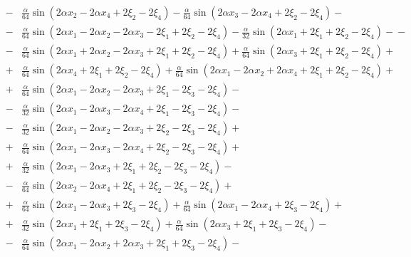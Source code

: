 \documentclass[11pt]{jfm}
\numberwithin{equation}{section}
\begin{document}
\begin{eqnarray}
&\!-\!& \frac{\alpha}{64} \sin(2\alpha x_2 \!-\! 2\alpha x_4 \!+\! 2\xi_2 \!-\! 2\xi_4)\!-\! \frac{\alpha}{64} \sin(2\alpha x_3 \!-\! 2\alpha x_4 \!+\! 2\xi_2 \!-\! 2\xi_4)\!-\! \nonumber\\
&\!-\! &\frac{\alpha}{64} \sin(2\alpha x_1 \!-\! 2\alpha x_2 \!-\! 2\alpha x_3 \!-\! 2\xi_1 \!+\! 2\xi_2 \!-\! 2\xi_4)\!-\! \frac{\alpha}{32} \sin(2\alpha x_1 \!+\! 2\xi_1 \!+\! 2\xi_2 \!-\! 2\xi_4)\!-\!
- \nonumber\\
&\!-\!&\frac{\alpha}{64} \sin(2\alpha x_1 \!+\! 2\alpha x_2 \!-\! 2\alpha x_3 \!+\! 2\xi_1 \!+\! 2\xi_2 \!-\! 2\xi_4)\!+\! \frac{\alpha}{64} \sin(2\alpha x_3 \!+\! 2\xi_1 \!+\! 2\xi_2 \!-\! 2\xi_4)\!+\!\nonumber\\
&\!+\!&\frac{\alpha}{64} \sin(2\alpha x_4 \!+\! 2\xi_1 \!+\! 2\xi_2 \!-\! 2\xi_4)\!+\! \frac{\alpha}{64} \sin(2\alpha x_1 \!-\! 2\alpha x_2 \!+\! 2\alpha x_4 \!+\! 2\xi_1 \!+\! 2\xi_2 \!-\! 2\xi_4)\!+\!\nonumber\\
&\!+\!& \frac{\alpha}{64} \sin(2\alpha x_1 \!-\! 2\alpha x_2 \!-\! 2\alpha x_3 \!+\! 2\xi_1 \!-\! 2\xi_3 \!-\! 2\xi_4)\!-\!\nonumber\\
&\!-\!&\frac{\alpha}{32} \sin(2\alpha x_1 \!-\! 2\alpha x_3 \!-\! 2\alpha x_4 \!+\! 2\xi_1 \!-\! 2\xi_3 \!-\! 2\xi_4)\!-\!\nonumber\\
&\!-\!& \frac{\alpha}{32} \sin(2\alpha x_1 \!-\! 2\alpha x_2 \!-\! 2\alpha x_3 \!+\! 2\xi_2 \!-\! 2\xi_3 \!-\! 2\xi_4)\!+\! \nonumber\\
&\!+\!& \frac{\alpha}{64} \sin(2\alpha x_1 \!-\! 2\alpha x_3 \!-\! 2\alpha x_4 \!+\! 2\xi_2 \!-\! 2\xi_3 \!-\! 2\xi_4)\!+\! \nonumber\\
&\!+\!& \frac{\alpha}{32} \sin(2\alpha x_1 \!-\! 2\alpha x_3 \!+\! 2\xi_1 \!+\! 2\xi_2 \!-\! 2\xi_3 \!-\! 2\xi_4)\!-\! \nonumber\\
&\!-\!& \frac{\alpha}{64} \sin(2\alpha x_2 \!-\! 2\alpha x_4 \!+\! 2\xi_1 \!+\! 2\xi_2 \!-\! 2\xi_3 \!-\! 2\xi_4)\!+\! \nonumber\\
&\!+\!& \frac{\alpha}{64} \sin(2\alpha x_1 \!-\! 2\alpha x_3 \!+\! 2\xi_3 \!-\! 2\xi_4)\!+\! \frac{\alpha}{64} \sin(2\alpha x_1 \!-\! 2\alpha x_4 \!+\! 2\xi_3 \!-\! 2\xi_4)\!+\!\nonumber\\
&\!+\!& \frac{\alpha}{32} \sin(2\alpha x_1 \!+\! 2\xi_1 \!+\! 2\xi_3 \!-\! 2\xi_4)\!+\! \frac{\alpha}{64} \sin(2\alpha x_3 \!+\! 2\xi_1 \!+\! 2\xi_3 \!-\! 2\xi_4)\!-\! \nonumber\\
&\!-\!& \frac{\alpha}{64} \sin(2\alpha x_1 \!-\! 2\alpha x_2 \!+\! 2\alpha x_3 \!+\! 2\xi_1 \!+\! 2\xi_3 \!-\! 2\xi_4)\!-\! \nonumber\\

\end{eqnarray}
\end{document}
